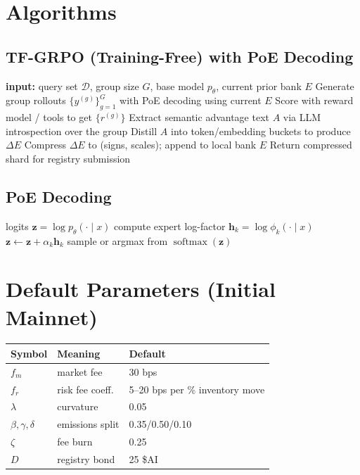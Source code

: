 \documentclass[11pt]{article}
\begin{document}
\section{Algorithms}
\subsection*{TF-GRPO (Training-Free) with PoE Decoding}
\begin{algorithm}[H]
\caption{Local ASO/TF-GRPO Step}
\begin{algorithmic}[1]
\State \textbf{input:} query set \(\mathcal D\), group size \(G\), base model \(p_\theta\), current prior bank \(E\)
  \State Generate group rollouts \(\{y^{(g)}\}_{g=1}^G\) with PoE decoding using current \(E\)
  \State Score with reward model / tools to get \(\{r^{(g)}\}\)
  \State Extract semantic advantage text \(A\) via LLM introspection over the group
  \State Distill \(A\) into token/embedding buckets to produce \(\Delta E\)
  \State Compress \(\Delta E\) to (signs, scales); append to local bank \(E\)
\EndFor
\State Return compressed shard for registry submission
\end{algorithmic}
\end{algorithm}

\subsection*{PoE Decoding}
\begin{algorithm}[H]
\caption{Product-of-Experts Decoding}
\begin{algorithmic}[1]
\State logits \(\bm z = \log p_\theta(\cdot\mid x)\)
  \State compute expert log-factor \(\bm h_k = \log \phi_k(\cdot\mid x)\)
  \State \(\bm z \leftarrow \bm z + \alpha_k \bm h_k\)
\EndFor
\State sample or argmax from \(\operatorname{softmax}(\bm z)\)
\end{algorithmic}
\end{algorithm}

\section{Default Parameters (Initial Mainnet)}
\begin{table}[h]
\centering
\begin{tabular}{lll}
\toprule
Symbol & Meaning & Default \\
\midrule
\(f_m\) & market fee & 30 bps \\
\(f_r\) & risk fee coeff. & 5--20 bps per \% inventory move \\
\(\lambda\) & curvature & 0.05 \\
\(\beta,\gamma,\delta\) & emissions split & 0.35/0.50/0.10 \\
\(\zeta\) & fee burn & 0.25 \\
\(D\) & registry bond & 25 \$AI \\
\bottomrule
\end{tabular}
\end{table}
\end{document}
